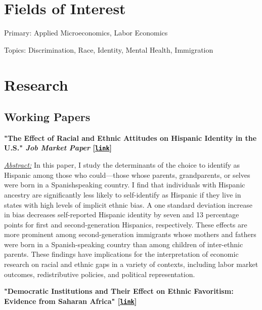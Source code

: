 \documentclass[10pt,letterpaper]{article}
\renewenvironment{itemize}{
  \begin{list}{}{
    \setlength{\leftmargin}{1.5em}
  }
}{
  \end{list}
}
\begin{document}
\section*{Fields of Interest}

Primary: Applied Microeconomics, Labor Economics

Topics: Discrimination, Race, Identity, Mental Health, Immigration

\section*{Research}
%
\subsection*{Working Papers}
\begin{itemize}

\item \textbf{"The Effect of Racial and Ethnic Attitudes on Hispanic Identity in the U.S." \emph{Job Market Paper} [\href{https://hhadah.github.io/Attitudes-and-Identity/my_paper/Hadah_JMP.pdf}{\tt link}]}

\bigskip

\underline{\textit{Abstract:}} In this paper, I study the determinants of the choice to identify as Hispanic among those who could—those whose parents, grandparents, or selves were born in a Spanishspeaking country. I find that individuals with Hispanic ancestry are significantly less likely to self-identify as Hispanic if they live in states with high levels of implicit ethnic bias. A one standard deviation increase in bias decreases self-reported Hispanic identity by seven and 13 percentage points for first and second-generation Hispanics, respectively. These effects are more prominent among second-generation immigrants whose mothers and fathers were born in a Spanish-speaking country than among children of inter-ethnic parents. These findings have implications for the interpretation of economic research on racial and ethnic gaps in a variety of contexts, including labor market outcomes, redistributive policies, and political representation.

\bigskip

\item \textbf{"Democratic Institutions and Their Effect on Ethnic Favoritism: Evidence from Saharan Africa" [\href{https://hhadah.github.io/ethnicfavoritism/my_paper/HussainHadahEthFav.pdf}{\tt link}]}

\bigskip


\end{itemize}
\end{document}

